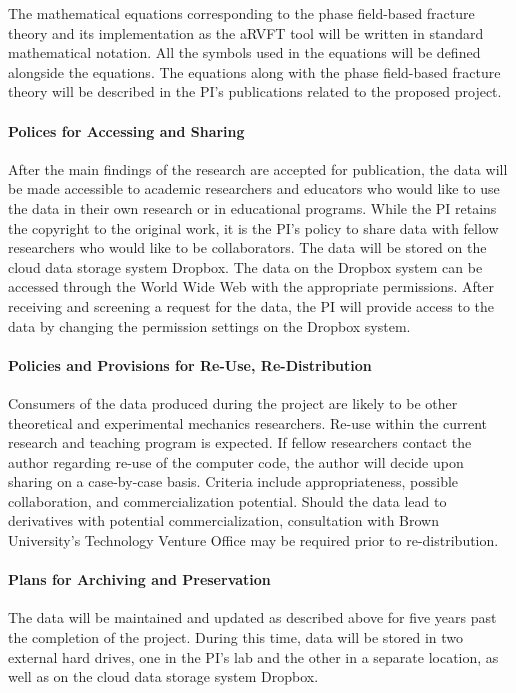 \documentclass[10 pt, letterpaper]{article}
\begin{document}
The mathematical equations corresponding to the phase field-based fracture theory and its implementation as the aRVFT tool will be written in standard mathematical notation. All the symbols used in the equations will be defined alongside the equations. The equations along with the phase field-based fracture theory will be described in the PI's publications related to the proposed project.

\paragraph{Polices for Accessing and Sharing}

After the main findings of the research are accepted for publication, the data will be made accessible to academic researchers and educators who would like to use the data in their own research or in educational programs. While the PI retains the copyright to the original work, it is the PI's policy to share data with fellow researchers who would like to be collaborators. The data will be stored on the cloud data storage system Dropbox. The data on the Dropbox system can be accessed through the World Wide Web with the appropriate permissions. After receiving and screening a request for the data, the PI will provide access to the data by changing the permission settings on the Dropbox system. 

\paragraph{Policies and Provisions for Re-Use, Re-Distribution}

Consumers of the data produced during the project are likely to be other theoretical and experimental mechanics researchers. Re-use within the current research and teaching program is expected. If fellow researchers contact the author regarding re-use of the computer code, the author will decide upon sharing on a case-by-case basis. Criteria include appropriateness, possible collaboration, and commercialization potential. Should the data lead to derivatives with potential commercialization, consultation with Brown University's Technology Venture Office may be required prior to re-distribution.

\paragraph{Plans for Archiving and Preservation}

The data will be maintained and updated as described above for five years past the completion of the project. During this time, data will be stored in two external hard drives, one in the PI's lab and the other in a separate location, as well as on the cloud data storage system Dropbox.
\end{document}
